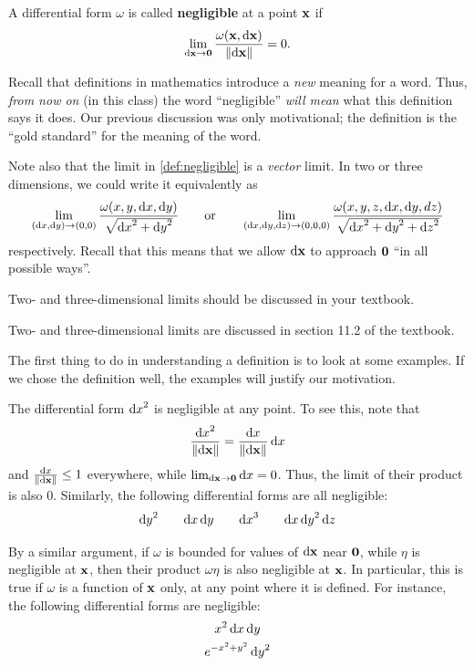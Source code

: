\documentclass[12pt]{amsart}
\begin{document}
\begin{defn}\label{def:negligible}
  A differential form $\omega$ is called \textbf{negligible} at a point $\mathbf{x}$ if
  \[ \lim_{{\mathrm{d} \mathbf{x}}\to\mathbf{0}} \frac{\omega(\mathbf{x},{\mathrm{d} \mathbf{x}})}{\Vert {\ensuremath{\mathrm{d} \mathbf{x}}} \Vert} = 0. \]
\end{defn}

Recall that definitions in mathematics introduce a \emph{new} meaning for a word.
Thus, \emph{from now on} (in this class) the word ``negligible'' \emph{will mean} what this definition says it does.
Our previous discussion was only motivational; the definition is the ``gold standard'' for the meaning of the word.

Note also that the limit in \cref{def:negligible} is a \emph{vector} limit.
In two or three dimensions, we could write it equivalently as
\[ \lim_{({\mathrm{d} x},{\mathrm{d} y})\to(0,0)} \frac{\omega(x,y,{\mathrm{d} x},{\mathrm{d} y})}{\sqrt{{\mathrm{d} x}^2+{\mathrm{d} y}^2}} \qquad\text{or}\qquad
\lim_{({\mathrm{d} x},{\mathrm{d} y},{\mathrm{d} z})\to(0,0,0)} \frac{\omega(x,y,z,{\mathrm{d} x},{\mathrm{d} y},dz)}{\sqrt{{\mathrm{d} x}^2+{\mathrm{d} y}^2+{\mathrm{d} z}^2}}
\]
respectively.
Recall that this means that we allow ${\mathrm{d} \mathbf{x}}$ to approach $\mathbf{0}$ ``in all possible ways''.
\begin{notextbook}Two- and three-dimensional limits should be discussed in your textbook.\end{notextbook}%
\begin{stewart}Two- and three-dimensional limits are discussed in section 11.2 of the textbook.\end{stewart}

The first thing to do in understanding a definition is to look at some examples.
If we chose the definition well, the examples will justify our motivation.

\begin{eg}
  The differential form ${\mathrm{d} x}^2$ is negligible at any point.
  To see this, note that
  \[ \frac{{\mathrm{d} x}^2}{\Vert {\ensuremath{\mathrm{d} \mathbf{x}}} \Vert} = \frac{{\mathrm{d} x}}{\Vert {\ensuremath{\mathrm{d} \mathbf{x}}} \Vert} \,{\mathrm{d} x} \]
  and $\frac{{\mathrm{d} x}}{\Vert {\ensuremath{\mathrm{d} \mathbf{x}}} \Vert}\le 1$ everywhere, while $\lim_{{\mathrm{d} \mathbf{x}}\to\mathbf{0}} {\mathrm{d} x} = 0$.
  Thus, the limit of their product is also $0$.
  Similarly, the following differential forms are all negligible:
  \[ {\mathrm{d} y}^2 \qquad {\ensuremath{\mathrm{d} x}}\,{\mathrm{d} y} \qquad {\ensuremath{\mathrm{d} x}}^3 \qquad {\ensuremath{\mathrm{d} x}}\,{\mathrm{d} y}^2\,{\mathrm{d} z} \]
\end{eg}

\begin{eg}
  By a similar argument, if $\omega$ is bounded for values of ${\mathrm{d} \mathbf{x}}$ near $\mathbf{0}$, while $\eta$ is negligible at $\mathbf{x}$, then their product $\omega\eta$ is also negligible at $\mathbf{x}$.
  In particular, this is true if $\omega$ is a function of $\mathbf{x}$ only, at any point where it is defined.
  For instance, the following differential forms are negligible:
  \begin{gather*}
    x^2\,{\mathrm{d} x}\,{\mathrm{d} y}\\
    e^{-x^2+y^2} \,{\mathrm{d} y}^2
  \end{gather*}
\end{eg}
\end{document}

